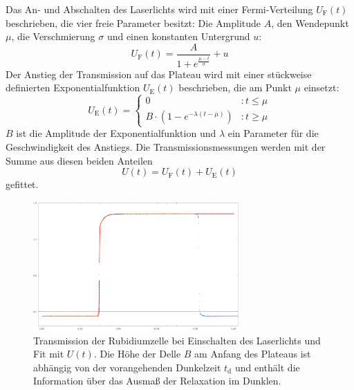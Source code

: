 Das An- und Abschalten des Laserlichts wird mit einer Fermi-Verteilung $U_{\text{F}}(t)$ beschrieben,
die vier freie Parameter besitzt:
Die Amplitude $A$, den Wendepunkt $\mu$, die Verschmierung $\sigma$ und einen konstanten Untergrund $u$:
\begin{equation}
  U_{\text{F}}(t)=\frac{A}{1+e^{\frac{\mu - t}{\sigma}}} + u
\end{equation}
Der Anstieg der Transmission auf das Plateau wird mit einer
stückweise definierten Exponentialfunktion $U_{\text{E}}(t)$
beschrieben, die am Punkt $\mu$ einsetzt:
\begin{equation}
  U_{\text{E}}(t)= \left\{
  \begin{array}{lr}
    0 & : t \leq \mu\\
    B \cdot (1-e^{-\lambda(t-\mu)}) & : t \geq \mu
  \end{array}
\right.
\end{equation}
$B$ ist die Amplitude der Exponentialfunktion und $\lambda$ ein Parameter für die Geschwindigkeit des Anstiegs.
Die Transmissionsmessungen werden mit der Summe aus diesen beiden Anteilen
\begin{equation}
\label{eq:fra:fitfunct}
   U(t)= U_{\text{F}}(t)+ U_{\text{E}}(t)
\end{equation}
gefittet.


\begin{figure}[H]
\begin{center}
  \includegraphics[width=0.7\textwidth]{../img/part6/exampletrans.pdf}
  \caption{Transmission der Rubidiumzelle bei Einschalten des Laserlichts und Fit mit $U(t)$.
  Die Höhe der Delle $B$ am Anfang des Plateaus ist abhängig von der vorangehenden Dunkelzeit $t_\text{d}$
  und enthält die Information über das Ausmaß der Relaxation im Dunklen.}
  \label{img:fra:exampletrans}
\end{center}
\end{figure}

